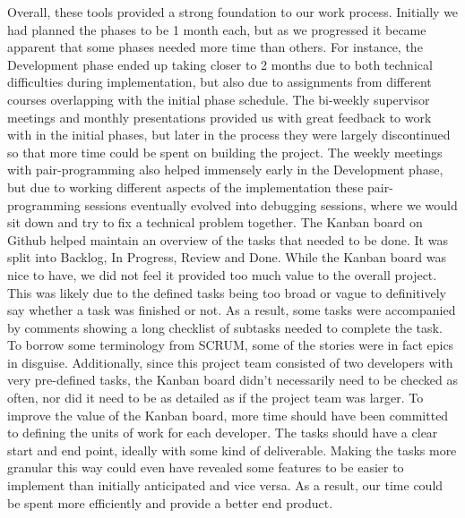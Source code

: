 Overall, these tools provided a strong foundation to our work process. Initially we had planned the phases to be 1 month
each, but as we progressed it became apparent that some phases needed more time than others. For instance, the
Development phase ended up taking closer to 2 months due to both technical difficulties during implementation, but also
due to assignments from different courses overlapping with the initial phase schedule.
The bi-weekly supervisor meetings and monthly presentations provided us with great feedback to work with in the initial
phases, but later in the process they were largely discontinued so that more time could be spent on building the project.
The weekly meetings with pair-programming also helped immensely early in the Development phase, but due to working different
aspects of the implementation these pair-programming sessions eventually evolved into debugging sessions, where we would
sit down and try to fix a technical problem together.
The Kanban board on Github helped maintain an overview of the tasks that needed to be done. It was split into Backlog, In Progress,
Review and Done. While the Kanban board was nice to have, we did not feel it provided too much value to the overall project.
This was likely due to the defined tasks being too broad or vague to definitively say whether a task was finished or not.
As a result, some tasks were accompanied by comments showing a long checklist of subtasks needed to complete the task. 
To borrow some terminology from SCRUM, some of the stories were in fact epics in disguise. Additionally, since this project
team consisted of two developers with very pre-defined tasks, the Kanban board didn't necessarily need to be checked as 
often, nor did it need to be as detailed as if the project team was larger.
To improve the value of the Kanban board, more time should have been committed to defining the units of work for each
developer. The tasks should have a clear start and end point, ideally with some kind of deliverable. Making the tasks more
granular this way could even have revealed some features to be easier to implement than initially anticipated and vice versa.
As a result, our time could be spent more efficiently and provide a better end product.
